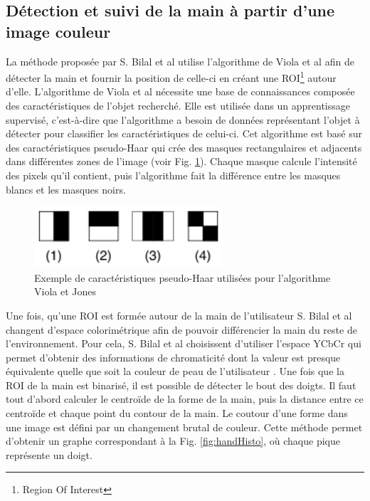 \subsection{Détection et suivi de la main à partir d'une image couleur}
La méthode proposée par S. Bilal et al \cite{haarlike} utilise l'algorithme de Viola et al \cite{viola2001jones} afin
de détecter la main et fournir la position de celle-ci en créant une ROI\footnote{Region Of Interest} autour d'elle.
L'algorithme de Viola et al \cite{viola2001jones} nécessite une 
base de connaissances composée des caractéristiques de l'objet recherché. Elle est utilisée dans un 
apprentissage supervisé, c'est-à-dire que l'algorithme a besoin de données représentant
l'objet à détecter pour classifier les caractéristiques de celui-ci. Cet algorithme est basé sur des caractéristiques 
pseudo-Haar qui crée des masques rectangulaires et adjacents dans différentes zones de l'image (voir Fig. \ref{fig:pseudo_haar}). 
Chaque masque calcule l'intensité des pixels qu'il contient, puis l'algorithme fait la différence entre les masques blancs et 
les masques noirs.\\

\begin{figure}[!h]
\center
\includegraphics[width=7cm]{images/pseudo_haar.png}
\caption{Exemple de caractéristiques pseudo-Haar utilisées pour l'algorithme Viola et Jones}
\label{fig:pseudo_haar}
\end{figure}

Une fois, qu'une ROI est formée autour de la main de l'utilisateur S. Bilal et al \cite{haarlike} changent d'espace colorimétrique
afin de pouvoir différencier la main du reste de l'environnement. Pour cela, S. Bilal et al \cite{haarlike} choisissent 
d'utiliser l'espace YCbCr qui permet d'obtenir des informations de chromaticité dont la valeur est presque équivalente
quelle que soit la couleur de peau de l'utilisateur \cite{yoo1999fast}. Une fois que la ROI de la main est binarisé, il est possible
de détecter le bout des doigts. Il faut tout d'abord calculer le centroïde de la forme de la main, puis la distance entre
ce centroïde et chaque point du contour de la main. Le coutour d'une forme dans une image est défini par un changement brutal
de couleur. Cette méthode permet d'obtenir un graphe correspondant à la Fig. \ref{fig:handHisto}, où chaque pique représente un doigt.

